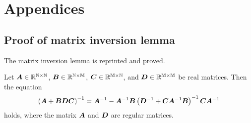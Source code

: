 \documentclass[twocolumn, a4paper, 10pt]{article}
\begin{document}

\appendix

\section{Appendices}\titlebar

\subsection{Proof of matrix inversion lemma}

The matrix inversion lemma is reprinted and proved.

\begin{theorem}
    Let
    $\boldsymbol{A} \in \mathbb{R^{N \times N}}$,
    $\boldsymbol{B} \in \mathbb{R^{N \times M}}$,
    $\boldsymbol{C} \in \mathbb{R^{M \times N}}$,
    and
    $\boldsymbol{D} \in \mathbb{R^{M \times M}}$
    be real matrices. Then the equation
    \begin{equation}
        \left( \boldsymbol{A} + \boldsymbol{BDC} \right)^{-1} = \boldsymbol{A}^{-1} - \boldsymbol{A}^{-1} \boldsymbol{B}
        \left( \boldsymbol{D}^{-1} + \boldsymbol{CA}^{-1} \boldsymbol{B} \right)^{-1} \boldsymbol{CA}^{-1}
    \end{equation}
    holds, where the matrix $\boldsymbol{A}$ and $\boldsymbol{D}$ are regular matrices.
\end{theorem}
\end{document}
